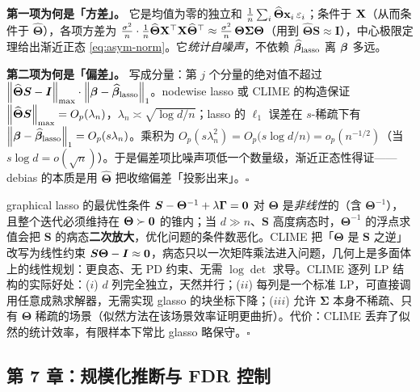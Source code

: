 \begin{description}[style=nextline, itemsep=1.2ex]
\textbf{第一项为何是「方差」。} 它是均值为零的独立和 $\frac{1}{n}\sum_i \widehat{\bm{\Theta}}\mathbf{x}_i\,\varepsilon_i$；条件于 $\mathbf{X}$（从而条件于 $\widehat{\bm{\Theta}}$），各项方差为 $\frac{\sigma^2}{n}\cdot\frac{1}{n}\widehat{\bm{\Theta}}\mathbf{X}^\top\mathbf{X}\widehat{\bm{\Theta}}^\top \approx \frac{\sigma^2}{n}\,\bm{\Theta}\bm{\Sigma}\bm{\Theta}$（用到 $\widehat{\bm{\Theta}}\bm{S} \approx \bm{I}$），中心极限定理给出渐近正态 \eqref{eq:asym-norm}。它\textit{统计自噪声}，不依赖 $\widehat{\bm{\beta}}_{\mathrm{lasso}}$ 离 $\bm{\beta}$ 多远。

\textbf{第二项为何是「偏差」。} 写成分量：第 $j$ 个分量的绝对值不超过 $\left\lVert \widehat{\bm{\Theta}}\bm{S} - \bm{I} \right\rVert_{\max} \cdot \left\lVert \bm{\beta} - \widehat{\bm{\beta}}_{\mathrm{lasso}} \right\rVert_1$。nodewise lasso 或 CLIME 的构造保证 $\left\lVert \widehat{\bm{\Theta}}\bm{S} \right\rVert_{\max} = O_p(\lambda_n)$，$\lambda_n \asymp \sqrt{\log d / n}$；lasso 的 $\ell_1$ 误差在 $s$-稀疏下有 $\left\lVert \bm{\beta} - \widehat{\bm{\beta}}_{\mathrm{lasso}} \right\rVert_1 = O_p(s\lambda_n)$。乘积为 $O_p(s\lambda_n^2) = O_p\big(s\log d / n\big) = o_p(n^{-1/2})$（当 $s\log d = o(\sqrt{n})$）。于是偏差项比噪声项低一个数量级，渐近正态性得证——debias 的本质是用 $\widehat{\bm{\Theta}}$ 把收缩偏差「投影出来」。$\square$

\item[练习 \ref{ex:glasso-clime}（讨论要点）]
graphical lasso 的最优性条件 $\bm{S} - \bm{\Theta}^{-1} + \lambda\bm{\Gamma} = \mathbf{0}$ 对 $\bm{\Theta}$ 是\textit{非线性}的（含 $\bm{\Theta}^{-1}$），且整个迭代必须维持在 $\bm{\Theta} \succ \mathbf{0}$ 的锥内；当 $d \gg n$、$\bm{S}$ 高度病态时，$\bm{\Theta}^{-1}$ 的浮点求值会把 $\bm{S}$ 的病态\textbf{二次放大}，优化问题的条件数恶化。CLIME 把「$\bm{\Theta}$ 是 $\bm{S}$ 之逆」改写为线性约束 $\bm{S}\bm{\Theta} - \bm{I} \approx \mathbf{0}$，病态只以一次矩阵乘法进入问题，几何上是多面体上的线性规划：更良态、无 PD 约束、无需 $\log\det$ 求导。CLIME 逐列 LP 结构的实际好处：($i$) $d$ 列完全独立，天然并行；($ii$) 每列是一个标准 LP，可直接调用任意成熟求解器，无需实现 glasso 的块坐标下降；($iii$) 允许 $\bm{\Sigma}$ 本身不稀疏、只有 $\bm{\Theta}$ 稀疏的场景（似然方法在该场景效率证明更曲折）。代价：CLIME 丢弃了似然的统计效率，有限样本下常比 glasso 略保守。$\square$
\end{description}

\subsection{第 7 章：规模化推断与 FDR 控制}


